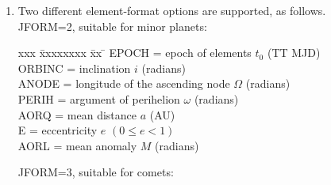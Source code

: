 \documentclass[11pt,twoside]{article}
\begin{document}
{
 \begin{enumerate}
  \item Two different element-format options are supported, as follows. \\

        JFORM=2, suitable for minor planets:

        \begin{tabbing}
        xxx \= xxxxxxxx \= xx \= \kill
        \> EPOCH  \> = \> epoch of elements $t_0$ (TT MJD) \\
        \> ORBINC \> = \> inclination $i$ (radians) \\
        \> ANODE  \> = \> longitude of the ascending node $\Omega$ (radians) \\
        \> PERIH  \> = \> argument of perihelion $\omega$ (radians) \\
        \> AORQ   \> = \> mean distance $a$ (AU) \\
        \> E      \> = \> eccentricity $e$ $( 0 \leq e < 1 )$ \\
        \> AORL   \> = \> mean anomaly $M$ (radians)
        \end{tabbing}

        JFORM=3, suitable for comets:


\end{enumerate}}
\end{document}
